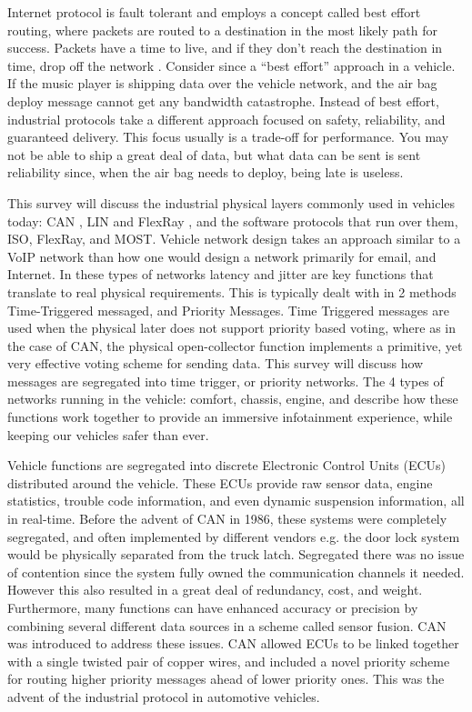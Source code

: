 \documentclass[conference,12pt]{IEEEtran}
\begin{document}
Internet protocol is fault
tolerant and employs a concept called best effort routing, where packets are
routed to a destination in the most likely path for success.  Packets have
a time to live, and if they don't reach the destination in time, drop off the
network \autocite{_best-effort_2014}. Consider since a ``best effort'' approach in a vehicle. 
If the music
player is shipping data over the vehicle network, and the air bag deploy message
cannot get any bandwidth catastrophe. Instead of best effort, industrial
protocols take a different approach focused on safety, reliability, and
guaranteed delivery. This focus usually is a trade-off for performance.  You may
not be able to ship a great deal of data, but what data can be sent is sent
reliability since, when the air bag needs to deploy, being late is useless.

This survey will discuss the industrial physical layers commonly used in
vehicles today: CAN \autocite{std_can}, LIN \autocite{std_lin} and FlexRay
\autocite{std_flexray}, and the software protocols that run over
them, ISO, FlexRay, and MOST. Vehicle network design takes an approach similar
to a VoIP network than how one would design a network primarily for email, and
Internet.  In these types of networks latency and jitter are key functions that
translate to real physical requirements. This is typically dealt with in
2 methods Time-Triggered messaged, and Priority Messages. Time Triggered
messages are used when the physical later does not support priority based voting,
where as   in the case of CAN, the physical open-collector function implements
a primitive, yet very effective voting scheme for sending data. This survey will
discuss how messages are segregated into time trigger, or priority networks.
The 4 types of networks running in the vehicle: comfort, chassis, engine, and
describe how these functions work together to provide an immersive infotainment
experience, while keeping our vehicles safer than ever.  

Vehicle functions are
segregated into discrete Electronic Control Units (ECUs) distributed around the
vehicle. These ECUs provide raw sensor data, engine statistics, trouble code
information, and even dynamic suspension information, all in real-time. Before
the advent of CAN in 1986, these systems were completely segregated, and often
implemented by different vendors e.g. the door lock system would be physically
separated from the truck latch.  Segregated there was no issue of contention
since the system fully owned the communication channels it needed. However this
also resulted in a great deal of redundancy, cost, and weight.  Furthermore,
many functions can have enhanced accuracy or precision
by combining several different data sources in a scheme called sensor fusion.
CAN was introduced to address these issues.  CAN allowed ECUs to be linked
together with a single twisted pair of copper wires, and included a novel
priority scheme for routing higher priority messages ahead of lower priority
ones. This was the advent of the industrial protocol in automotive vehicles.
\end{document}

